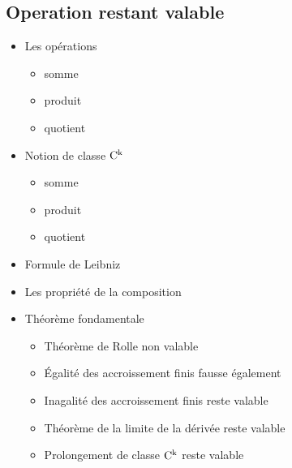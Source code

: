 \subsection{Operation restant valable}
\begin{itemize}
    \item Les opérations
    \begin{itemize}
        \item somme
        \item produit
        \item quotient
    \end{itemize}
    \item Notion de classe $\mathrm{C^{k}}$
    \begin{itemize}
        \item somme
        \item produit
        \item quotient
    \end{itemize}
    \item Formule de Leibniz
    \item Les propriété de la composition
    \item Théorème fondamentale
    \begin{itemize}
        \item Théorème de Rolle non valable
        \item \'Egalité des accroissement finis fausse également
        \item Inagalité des accroissement finis reste valable
        \item Théorème de la limite de la dérivée reste valable
        \item Prolongement de classe $\mathrm{C^{k}}$ reste valable
    \end{itemize}
\end{itemize}


